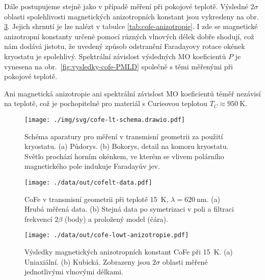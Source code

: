 Dále postupujeme stejně jako v případě měření při pokojové teplotě.
Výsledné $2\sigma$ oblasti spolehlivosti magnetických anizotropních konstant jsou vykresleny na obr. \ref{fig:vysledky-cofe-lowt-anizotropie}.
Jejich shrnutí je lze nalézt v tabulce \ref{tab:cofe-anizotropie}.
I zde se magnetické anizotropní konstanty určené pomocí různých vlnových délek dobře shodují, což nám dodává jistotu, že uvedený způsob odstranění Faradayovy rotace okének kryostatu je spolehlivý.
Spektrální závislost výsledných MO koeficientů $P$ je vynesena na obr.~\ref{fig:vysledky-cofe-PMLD} společně s těmi měřenými při pokojové teplotě.

Ani magnetická anizotropie ani spektrální závislost MO koeficientů téměř nezávisí na teplotě, což je pochopitelné pro materiál s Curieovou teplotou $T_C\approx \SI{950}{\kelvin}$\cite{sundarSoftMagneticFeCo2005}.


\begin{figure}[htbp]
    \centering
    \texttt{[image: ./img/svg/cofe-lt-schema.drawio.pdf]}
    \caption{Schéma aparatury pro měření v transmisní geometrii za použití kryostatu. (a) Půdorys. (b) Bokorys, detail na komoru kryostatu.
    Světlo prochází horním okénkem, ve kterém se vlivem polárního magnetického pole indukuje Faradayův jev.}
    \label{fig:vysledky-cofe-lowt-schema}
\end{figure}

\begin{figure}[htbp]
    \centering
        \texttt{[image: ./data/out/cofelt-data.pdf]}
        \caption{CoFe v transmisní geometrii při teplotě \SI{15}{\kelvin}, $\lambda=\SI{620}{\nano\meter}$. (a) Hrubá měřená data. (b) Stejná data po symetrizaci v poli a filtraci frekvencí $2\beta$ (body) a proložený model (čára).}
    \label{fig:vysledky-cofe-lowt-data}
\end{figure}

\begin{figure}[htbp]
    \centering
    \texttt{[image: ./data/out/cofe-lowt-anizotropie.pdf]}
    \caption{Výsledky magnetických anizotropních konstant CoFe při \SI{15}{\kelvin}. (a) Uniaxiální. (b) Kubická. Zobrazeny jsou $2\sigma$ oblasti měřené jednotlivými vlnovými délkami.}
    \label{fig:vysledky-cofe-lowt-anizotropie}
\end{figure}


